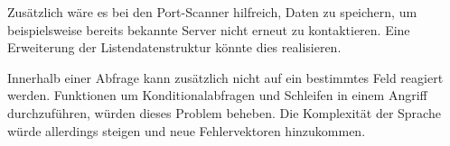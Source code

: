 Zusätzlich wäre es bei den Port-Scanner hilfreich, Daten zu speichern, um beispielsweise bereits bekannte Server nicht erneut zu kontaktieren. Eine Erweiterung der Listendatenstruktur könnte dies realisieren.

Innerhalb einer Abfrage kann zusätzlich nicht auf ein bestimmtes Feld reagiert werden. Funktionen um Konditionalabfragen und Schleifen in einem Angriff durchzuführen, würden dieses Problem beheben. Die Komplexität der Sprache würde allerdings steigen und neue Fehlervektoren hinzukommen.
